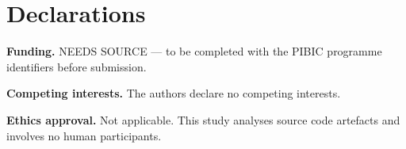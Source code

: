 \documentclass{sbc2019}%
\begin{document}
\section*{Declarations}

\noindent\textbf{Funding.} NEEDS SOURCE --- to be completed with the PIBIC
programme identifiers before submission.

\noindent\textbf{Competing interests.} The authors declare no competing
interests.

\noindent\textbf{Ethics approval.} Not applicable. This study analyses source
code artefacts and involves no human participants.



\end{document}
